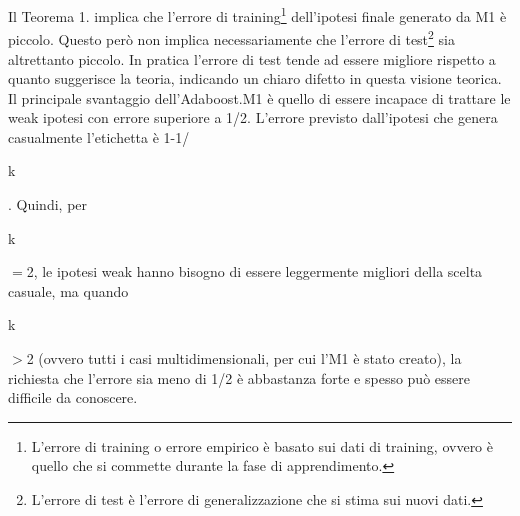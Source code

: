 Il Teorema 1. implica che l'errore di training\footnote{L'errore di training o errore empirico 
\`e basato sui dati di training, ovvero \`e quello che si commette durante la fase di apprendimento.} 
dell'ipotesi finale generato da M1 \`e piccolo.
Questo per\`o non implica necessariamente che l'errore di test\footnote{L'errore di test \`e l'errore di 
generalizzazione che si stima sui nuovi dati.} 
sia altrettanto piccolo. In pratica l'errore di test tende ad essere 
migliore rispetto a quanto suggerisce la teoria, indicando un chiaro difetto in questa visione teorica.\\
\newline
Il principale svantaggio dell'Adaboost.M1 \`e quello di essere incapace di trattare le weak ipotesi 
con errore superiore a 1/2. L'errore previsto dall'ipotesi che genera casualmente l'etichetta \`e 
1-1/\begin{it}k\end{it}. Quindi, per \begin{it}k\end{it}\begin{math}=\end{math}2, le ipotesi weak hanno bisogno di essere leggermente migliori 
della scelta casuale, ma quando \begin{it}k\end{it}\begin{math}>\end{math}2 (ovvero tutti i casi multidimensionali, per cui
l'M1 \`e stato creato), la richiesta che l'errore sia meno di 1/2 \`e abbastanza forte e spesso pu\`o
 essere difficile da conoscere.
\newpage
\vspace{1.5cm}





